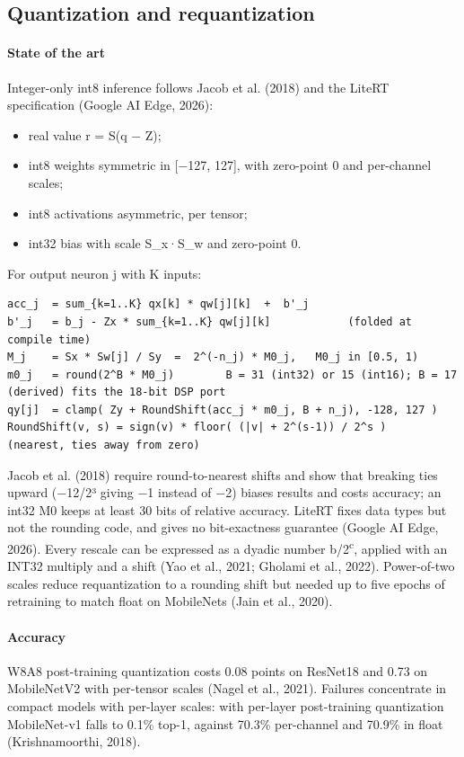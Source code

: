 \subsection{Quantization and requantization}

\paragraph{State of the art} Integer-only int8 inference follows Jacob et al. (2018) and the LiteRT specification (Google AI Edge, 2026):
\begin{itemize}
\item real value r = S(q − Z);
\item int8 weights symmetric in {[}−127, 127{]}, with zero-point 0 and per-channel scales;
\item int8 activations asymmetric, per tensor;
\item int32 bias with scale S\_x·S\_w and zero-point 0.
\end{itemize}

For output neuron j with K inputs:

\begin{lstlisting}[language={},numbers=none,basicstyle=\ttfamily\scriptsize,xleftmargin=6pt,breaklines=true]
acc_j  = sum_{k=1..K} qx[k] * qw[j][k]  +  b'_j
b'_j   = b_j - Zx * sum_{k=1..K} qw[j][k]            (folded at compile time)
M_j    = Sx * Sw[j] / Sy  =  2^(-n_j) * M0_j,   M0_j in [0.5, 1)
m0_j   = round(2^B * M0_j)        B = 31 (int32) or 15 (int16); B = 17 (derived) fits the 18-bit DSP port
qy[j]  = clamp( Zy + RoundShift(acc_j * m0_j, B + n_j), -128, 127 )
RoundShift(v, s) = sign(v) * floor( (|v| + 2^(s-1)) / 2^s )   (nearest, ties away from zero)
\end{lstlisting}

Jacob et al. (2018) require round-to-nearest shifts and show that breaking ties upward (−12/2³ giving −1 instead of −2) biases results and costs accuracy; an int32 M0 keeps at least 30 bits of relative accuracy. LiteRT fixes data types but not the rounding code, and gives no bit-exactness guarantee (Google AI Edge, 2026). Every rescale can be expressed as a dyadic number b/2\textsuperscript{c}, applied with an INT32 multiply and a shift (Yao et al., 2021; Gholami et al., 2022). Power-of-two scales reduce requantization to a rounding shift but needed up to five epochs of retraining to match float on MobileNets (Jain et al., 2020).

\paragraph{Accuracy} W8A8 post-training quantization costs 0.08 points on ResNet18 and 0.73 on MobileNetV2 with per-tensor scales (Nagel et al., 2021). Failures concentrate in compact models with per-layer scales: with per-layer post-training quantization MobileNet-v1 falls to 0.1\% top-1, against 70.3\% per-channel and 70.9\% in float (Krishnamoorthi, 2018).


